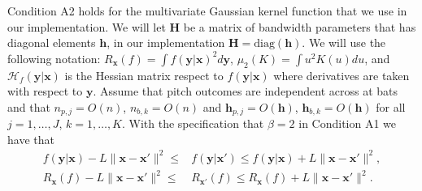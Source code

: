 \documentclass[11pt]{article}
\newcommand{\Hcal}{\mathcal{H}}
\newcommand{\Hbf}{\textbf{H}}
\newcommand{\y}{\textbf{y}}
\newcommand{\x}{\textbf{x}}
\newcommand{\h}{\textbf{h}}
\DeclareMathOperator{\E}{E}
\DeclareMathOperator{\Var}{Var}
\begin{document}
Condition A2 holds for the multivariate Gaussian kernel function that we use in our implementation.
We will let $\Hbf$ be a matrix of bandwidth parameters that has diagonal elements $\h$, in our implementation $\Hbf = \text{diag}(\h)$. We will use the following notation: $R_{\x}(f) = \int f(\y|\x)^2 d\y$, $\mu_2(K) = \int u^2K(u)du$, and $\Hcal_f(\y|\x)$ is the Hessian matrix respect to $f(\y|\x)$ where derivatives are taken with respect to $\y$. Assume that pitch outcomes are independent across at bats and that $n_{p,j} = O(n)$, $n_{b,k} = O(n)$ and $\h_{p,j} = O(\h)$, $\h_{b,k} = O(\h)$ for all $j = 1, \ldots, J$, $k = 1, \ldots, K$. With the specification that $\beta = 2$ in Condition A1 we have that 
 \begin{align*}
   f(\y|\x) - L\|\x-\x'\|^2 \leq &f(\y|\x') \leq f(\y|\x) + L\|\x-\x'\|^2, \\
   R_\x(f) - L\|\x-\x'\|^2 \leq &R_{\x'}(f) \leq R_\x(f) + L\|\x-\x'\|^2.
 \end{align*}
\end{document}
